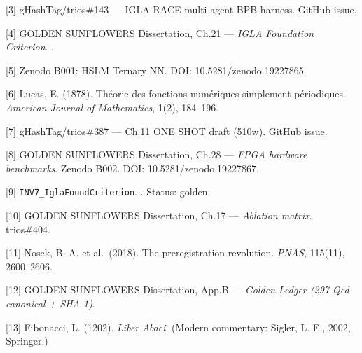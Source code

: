 [3] gHashTag/trios\#143 --- IGLA-RACE
multi-agent BPB harness. GitHub issue.

[4] GOLDEN SUNFLOWERS Dissertation, Ch.21 ---
\emph{IGLA Foundation Criterion}.
.

[5] Zenodo B001: HSLM Ternary NN. DOI:
10.5281/zenodo.19227865.

[6] Lucas, E. (1878). Théorie des fonctions
numériques simplement périodiques. \emph{American
Journal of Mathematics}, 1(2), 184--196.

[7] gHashTag/trios\#387 --- Ch.11 ONE SHOT
draft (510w). GitHub issue.

[8] GOLDEN SUNFLOWERS Dissertation, Ch.28 ---
\emph{FPGA hardware benchmarks}. Zenodo B002. DOI:
10.5281/zenodo.19227867.

[9] \texttt{INV7\_IglaFoundCriterion}.
.
Status: golden.

[10] GOLDEN SUNFLOWERS Dissertation, Ch.17 ---
\emph{Ablation matrix}. trios\#404.

[11] Nosek, B. A. et al.~(2018). The
preregistration revolution. \emph{PNAS}, 115(11),
2600--2606.

[12] GOLDEN SUNFLOWERS Dissertation, App.B ---
\emph{Golden Ledger (297 Qed canonical + SHA-1)}.

[13] Fibonacci, L. (1202). \emph{Liber Abaci}.
(Modern commentary: Sigler, L. E., 2002,
Springer.)

